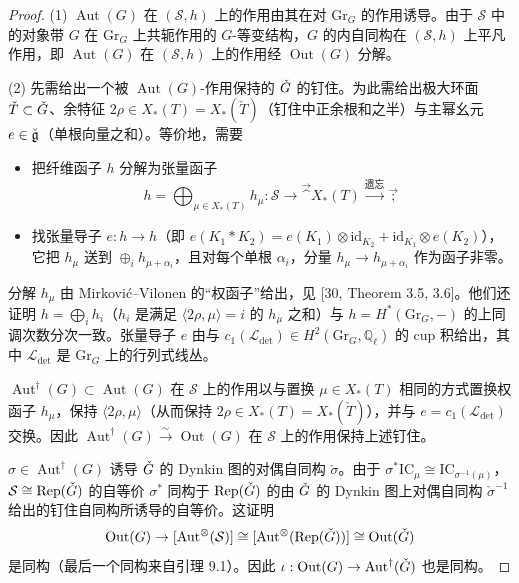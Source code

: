 \begin{proof}
(1) $\operatorname{Aut}(G)$ 在 $(\mathcal S,h)$ 上的作用由其在对 $\mathrm{Gr}_G$ 的作用诱导。由于 $\mathcal S$ 中的对象带 $G$ 在 $\mathrm{Gr}_G$ 上共轭作用的 $G$-等变结构，$G$ 的内自同构在 $(\mathcal S,h)$ 上平凡作用，即 $\operatorname{Aut}(G)$ 在 $(\mathcal S,h)$ 上的作用经 $\operatorname{Out}(G)$ 分解。

(2) 先需给出一个被 $\operatorname{Aut}(G)$-作用保持的 $\check G$ 的钉住。为此需给出极大环面 $\check T\subset\check G$、余特征 $2\rho\in X_*(T)=X_*(\check T)$（钉住中正余根和之半）与主幂幺元 $e\in\check{\mathfrak g}$（单根向量之和）。等价地，需要
\begin{itemize}[leftmargin=1.6em, itemsep=.2em]
\item[(P1)] 把纤维函子 $h$ 分解为张量函子
\[
h=\bigoplus_{\mu\in X_*(T)}h_\mu:\mathcal S\to\Vec^{X_*(T)}\xrightarrow{\text{遗忘}}\Vec;
\]
\item[(P2)] 找张量导子 $e:h\to h$（即 $e(K_1*K_2)=e(K_1)\otimes\mathrm{id}_{K_2}+\mathrm{id}_{K_1}\otimes e(K_2)$），它把 $h_\mu$ 送到 $\oplus_ih_{\mu+\alpha_i}$，且对每个单根 $\alpha_i$，分量 $h_\mu\to h_{\mu+\alpha_i}$ 作为函子非零。
\end{itemize}

分解 $h_\mu$ 由 Mirković--Vilonen 的“权函子”给出，见 [30, Theorem 3.5, 3.6]。他们还证明 $h=\bigoplus_ih_i$（$h_i$ 是满足 $\langle2\rho,\mu\rangle=i$ 的 $h_\mu$ 之和）与 $h=H^*(\mathrm{Gr}_G,-)$ 的上同调次数分次一致。张量导子 $e$ 由与 $c_1(\mathcal L_{\det})\in H^2(\mathrm{Gr}_G,\mathbb{Q}_\ell)$ 的 cup 积给出，其中 $\mathcal L_{\det}$ 是 $\mathrm{Gr}_G$ 上的行列式线丛。

$\operatorname{Aut}^\dagger(G)\subset\operatorname{Aut}(G)$ 在 $\mathcal S$ 上的作用以与置换 $\mu\in X_*(T)$ 相同的方式置换权函子 $h_\mu$，保持 $\langle2\rho,\mu\rangle$（从而保持 $2\rho\in X_*(T)=X_*(\check T)$），并与 $e=c_1(\mathcal L_{\det})$ 交换。因此 $\operatorname{Aut}^\dagger(G)\xrightarrow{\sim}\operatorname{Out}(G)$ 在 $\mathcal S$ 上的作用保持上述钉住。

$\sigma\in\operatorname{Aut}^\dagger(G)$ 诱导 $\check G$ 的 Dynkin 图的对偶自同构 $\check\sigma$。由于 $\sigma^*\mathrm{IC}_\mu\cong\mathrm{IC}_{\sigma^{-1}(\mu)}$，$\mathcal S\cong\mathrm{Rep}(\check G)$ 的自等价 $\sigma^*$ 同构于 $\mathrm{Rep}(\check G)$ 的由 $\check G$ 的 Dynkin 图上对偶自同构 $\check\sigma^{-1}$ 给出的钉住自同构所诱导的自等价。这证明
\[
\operatorname{Out}(G)\to[\operatorname{Aut}^\otimes(\mathcal S)]\cong[\operatorname{Aut}^\otimes(\mathrm{Rep}(\check G))]\cong\operatorname{Out}(\check G)
\]
是同构（最后一个同构来自引理 9.1）。因此 $\iota:\operatorname{Out}(G)\to\operatorname{Aut}^\dagger(\check G)$ 也是同构。
\end{proof}

